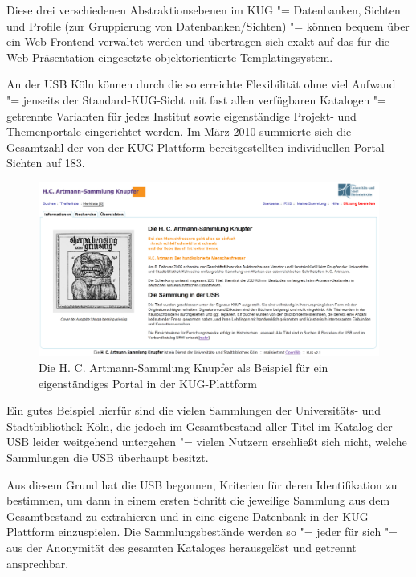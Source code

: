 \documentclass[11pt]{scrartcl}
\begin{document}
Diese drei verschiedenen Abstraktionsebenen im KUG "= Datenbanken,
Sichten und Profile (zur Gruppierung von Datenbanken/Sichten) "=
können bequem über ein Web-Frontend verwaltet werden und übertragen
sich exakt auf das für die Web-Präsentation eingesetzte
objektorientierte Templatingsystem.

An der USB Köln können durch die so erreichte Flexibilität ohne viel
Aufwand "= jenseits der Standard-KUG-Sicht mit fast allen verfügbaren
Katalogen "= getrennte Varianten für jedes Institut sowie
eigenständige Projekt- und Themenportale eingerichtet werden. Im März
2010 summierte sich die Gesamtzahl der von der KUG-Plattform
bereitgestellten individuellen Portal-Sichten auf 183.

\begin{figure}[ht]
    \centering \begin{minipage}[b]{1.0\textwidth}
      \centering \includegraphics[width=15cm]{bib20-kug-mashups_bilder/artmann.png}
    \end{minipage}
    \caption{Die H. C. Artmann-Sammlung Knupfer als Beispiel für ein eigenständiges Portal in der KUG-Plattform}
  \label{bild:artmann}
\end{figure}

Ein gutes Beispiel hierfür sind die vielen Sammlungen der
Universitäts- und Stadtbibliothek Köln, die jedoch im Gesamtbestand
aller Titel im Katalog der USB leider weitgehend untergehen "= vielen
Nutzern erschließt sich nicht, welche Sammlungen die USB überhaupt
besitzt.

Aus diesem Grund hat die USB begonnen, Kriterien für deren
Identifikation zu bestimmen, um dann in einem ersten Schritt die
jeweilige Sammlung aus dem Gesamtbestand zu extrahieren und in eine
eigene Datenbank in der KUG-Plattform einzuspielen. Die
Sammlungsbestände werden so "= jeder für sich "= aus der Anonymität
des gesamten Kataloges herausgelöst und getrennt ansprechbar.
\end{document}
